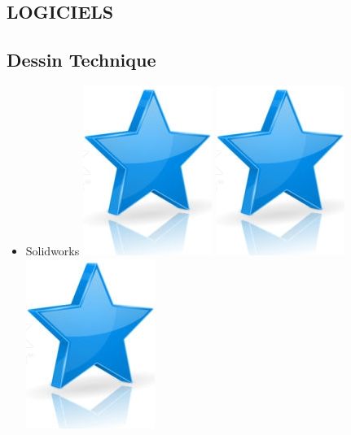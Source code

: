 \documentclass[10pt,a4paper,sans]{article}
\begin{document}
\begin{minipage}[t]{0.26\textwidth}
    \begin{mdframed}[style=cadreCompetences]
        \section{LOGICIELS}
        \subsection{Dessin Technique}
        \begin{itemize}
            \item{Solidworks
                    \hfill
                    \includegraphics[scale=0.20]{img/star.png} \hspace{-0.2cm}
                    \includegraphics[scale=0.20]{img/star.png} \hspace{-0.2cm}
                    \includegraphics[scale=0.20]{img/star.png} \hspace{-0.2cm}
}
\end{itemize}
\end{mdframed}
\end{minipage}
\end{document}
